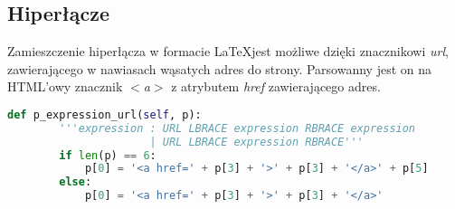\subsection{Hiperłącze}

Zamieszczenie hiperłącza w formacie \LaTeX jest możliwe dzięki znacznikowi \textit{url}, 
zawierającego w nawiasach wąsatych adres do strony.
Parsowanny jest on na HTML'owy znacznik \textit{$<$a$>$} z atrybutem \textit{href} zawierającego adres.

\begin{lstlisting}[language={Python}, caption={Gramatyka - hiperłącze}, label={gramatyka-hiperlacze} ]
    def p_expression_url(self, p):
        '''expression : URL LBRACE expression RBRACE expression
                      | URL LBRACE expression RBRACE'''
        if len(p) == 6:
            p[0] = '<a href=' + p[3] + '>' + p[3] + '</a>' + p[5]
        else:
            p[0] = '<a href=' + p[3] + '>' + p[3] + '</a>'
\end{lstlisting}